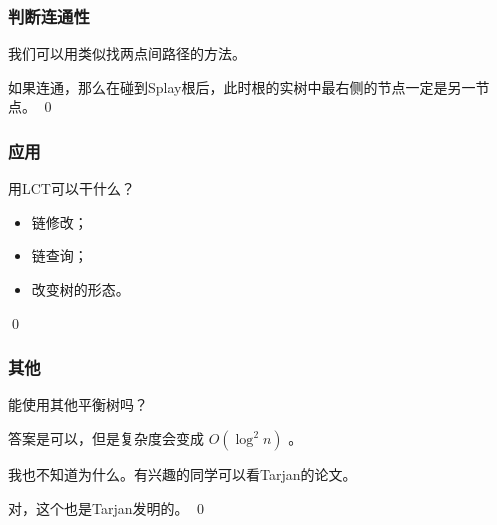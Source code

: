 \documentclass[9pt,dvipsnames,table]{beamer}
\newenvironment{qedframe}{%
	\begin{frame}[environment=qedqedframe]%
	}{%
	\qed
	\end{frame}%
}
\begin{document}
\begin{qedframe}
	\frametitle{判断连通性}
	我们可以用类似找两点间路径的方法。
	
	如果连通，那么在碰到Splay根后，此时根的实树中最右侧的节点一定是另一节点。
\end{qedframe}
\begin{qedframe}
	\frametitle{应用}
	用LCT可以干什么？\pause
	\begin{itemize}
		\item 链修改；
		\item 链查询；
		\item 改变树的形态。
	\end{itemize}
\end{qedframe}
\begin{qedframe}
	\frametitle{其他}
	能使用其他平衡树吗？\pause
	
	答案是可以，但是复杂度会变成 $ O(\log^2n) $ 。
	
	我也不知道为什么。有兴趣的同学可以看Tarjan的论文。
	
	对，这个也是Tarjan发明的。
\end{qedframe}
\end{document}
